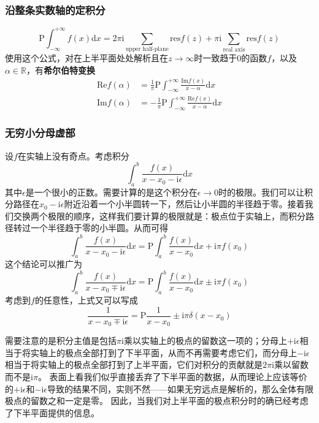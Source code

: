 \documentclass[UTF8]{ctexart}
\newcommand*{\reals}{\mathbb{R}}
\begin{document}
\hypertarget{ux6cbfux6574ux6761ux5b9eux6570ux8f74ux7684ux5b9aux79efux5206}{%
\subsubsection{沿整条实数轴的定积分}\label{ux6cbfux6574ux6761ux5b9eux6570ux8f74ux7684ux5b9aux79efux5206}}

\[
\mathrm{P} \int_{-\infty}^{+\infty} f(x) \mathrm{d}x = 2 \pi  \mathrm{i} \sum_{\text{upper half-plane}} \mathrm{res} f(z) + \pi \mathrm{i} \sum_{\text{real axis}} \mathrm{res} f(z)
\]
使用这个公式，对在上半平面处处解析且在$z \to \infty$时一致趋于0的函数$f$，以及$\alpha \in \reals$，有\textbf{希尔伯特变换}
\[
\begin{aligned}
    \mathrm{Re} f(\alpha) &= \frac{1}{\pi} \mathrm{P} \int_{-\infty}^{+\infty} \frac{\mathrm{Im} f(x)}{x - \alpha} \mathrm{d} x \\
    \mathrm{Im} f(\alpha) &= - \frac{1}{\pi} \mathrm{P} \int_{-\infty}^{+\infty} \frac{\mathrm{Re} f(x)}{x - \alpha} \mathrm{d} x 
\end{aligned}
\]

\hypertarget{ux65e0ux7a77ux5c0fux5206ux6bcdux865aux90e8}{%
\subsubsection{无穷小分母虚部}\label{ux65e0ux7a77ux5c0fux5206ux6bcdux865aux90e8}}

设$f$在实轴上没有奇点。考虑积分 \[
\int_a^b \frac{f(x)}{x-x_0 - \mathrm{i}\epsilon} \mathrm{d}x
\]
其中$\epsilon$是一个很小的正数。需要计算的是这个积分在$\epsilon\to 0$时的极限。我们可以让积分路径在$x_0 - \mathrm{i}\epsilon$附近沿着一个小半圆转一下，然后让小半圆的半径趋于零。接着我们交换两个极限的顺序，这样我们要计算的极限就是：极点位于实轴上，而积分路径转过一个半径趋于零的小半圆。从而可得
\[
\int_a^b \frac{f(x)}{x-x_0 - \mathrm{i}\epsilon} \mathrm{d}x = \mathrm{P} \int_a^b \frac{f(x)}{x-x_0} \mathrm{d}x + \mathrm{i} \pi f(x_0)
\] 这个结论可以推广为 \[
\int_a^b \frac{f(x)}{x-x_0 \mp \mathrm{i}\epsilon} \mathrm{d}x = \mathrm{P} \int_a^b \frac{f(x)}{x-x_0} \mathrm{d}x \pm \mathrm{i} \pi f(x_0)
\] 考虑到$f$的任意性，上式又可以写成 \[
\frac{1}{x - x_0 \mp \mathrm{i}\epsilon} = \mathrm{P} \frac{1}{x - x_0} \pm \mathrm{i} \pi \delta(x - x_0)
\]

需要注意的是积分主值是包括$\pi \mathrm{i}$乘以实轴上的极点的留数这一项的；分母上$+\mathrm{i} \epsilon$相当于将实轴上的极点全部打到了下半平面，从而不再需要考虑它们，而分母上$- \mathrm{i} \epsilon$相当于将实轴上的极点全部打到了上半平面，它们对积分的贡献就是$2\pi \mathrm{i}$乘以留数而不是$\mathrm{i} \pi$。
表面上看我们似乎直接丢弃了下半平面的数据，从而理论上应该等价的$+ \mathrm{i} \epsilon$和$- \mathrm{i} \epsilon$导致的结果不同，实则不然——如果无穷远点是解析的，那么全体有限极点的留数之和一定是零。
因此，当我们对上半平面的极点积分时的确已经考虑了下半平面提供的信息。
\end{document}
